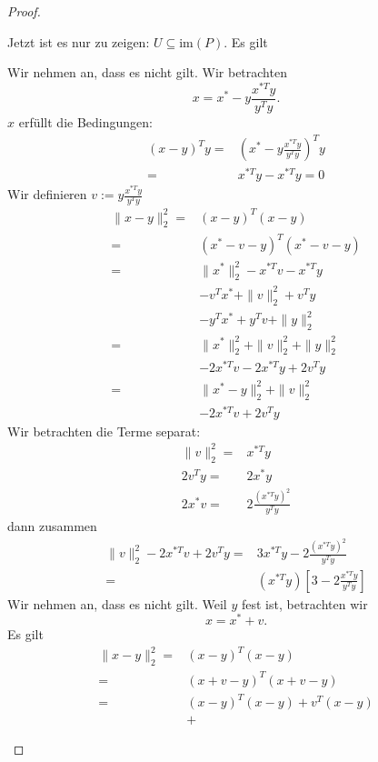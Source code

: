 \begin{proof}
\begin{parts}
		Jetzt ist es nur zu zeigen: $U\subseteq \text{im}(P)$. Es gilt
	\item Wir nehmen an, dass es nicht gilt. Wir betrachten
		\[
			x=x^*-y\frac{x^{*T}y}{y^Ty} 
		.\] 
		$x$ erf\"{u}llt die Bedingungen:
		\begin{align}
			(x-y)^Ty=&\left( x^*-y\frac{x^{*T}y}{y^T y} \right)^Ty\\ 
			=&x^{*T}y-x^{*T}y=0
		\end{align}
		Wir definieren $v:=y\frac{x^{*T}y}{y^Ty}$
		\begin{align*}
			\|x-y\|_2^2=&(x-y)^T(x-y)\\
			=&(x^*-v-y)^T(x^*-v-y)\\
			=&\|x^*\|_2^2-x^{*T}v-x^{*T}y\\
			 &-v^Tx^*+\|v\|_2^2+v^Ty\\
			 &-y^Tx^*+y^Tv+\|y\|_2^2\\
			=&\|x^*\|_2^2+\|v\|_2^2+\|y\|_2^2\\
			 &-2x^{*T}v-2x^{*T}y+2v^Ty\\
			=&\|x^*-y\|_2^2+\|v\|_2^2\\
			 &-2x^{*T}v+2v^Ty
		\end{align*}
		Wir betrachten die Terme separat:
		\begin{align*}
			\|v\|_2^2=&x^{*T}y\\
			2v^Ty=&2x^*y\\
			2x^*v=&2\frac{(x^{*T}y)^2}{y^Ty}
		\end{align*}
		dann zusammen
		\begin{align*}
			\|v\|_2^2-2x^{*T}v+2v^Ty=&3x^{*T}y-2\frac{(x^{*T}y)^2}{y^Ty}\\
			=&(x^{*T}y)\left[ 3-2\frac{x^{*T}y}{y^Ty} \right] 
		\end{align*}
		Wir nehmen an, dass es nicht gilt. Weil $y$ fest ist, betrachten wir
		\[
		x=x^*+v
		.\] 
		Es gilt
		\begin{align*}
			\|x-y\|_2^2=&(x-y)^T(x-y)\\
			=&(x+v-y)^T(x+v-y)\\
			=&(x-y)^T(x-y)+v^T(x-y)\\
			 &+
		\end{align*}
	\end{parts}
\end{proof}

